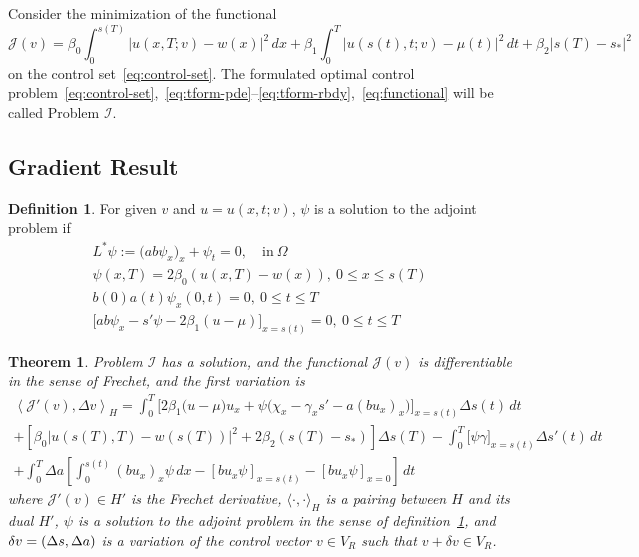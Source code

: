 \documentclass[letterpaper, 10pt, draft]{amsart}
\newtheorem{theorem}{Theorem}
\theoremstyle{definition}
\newtheorem{definition}{Definition}
\theoremstyle{remark}
\newcommand{\lnorm}[1]{\left\vert #1\right\vert}%
\begin{document}
Consider the minimization of the functional
\def\J{\mathcal{J}}
\begin{equation}
  \J(v)
  = \beta_0 \int_0^{s(T)} \lnorm{u(x, T; v) - w(x)}^2\,dx
  + \beta_1 \int_0^T \lnorm{u(s(t), t; v) - \mu(t)}^2\,dt
  + \beta_2 \lnorm{s(T) - s_*}^2\label{eq:functional}
\end{equation}
on the control set~\eqref{eq:control-set}.
\def\I{\mathcal{I}}
The formulated optimal control problem~\eqref{eq:control-set},~\eqref{eq:tform-pde}--\eqref{eq:tform-rbdy},~\eqref{eq:functional} will be called Problem $\I$.

\subsection{Gradient Result}\label{sec:frechet-gradient}

\begin{definition}\label{defn:adjoint}
  For given $v$ and $u = u(x, t; v)$, $\psi$ is a solution to the adjoint problem if
  \begin{gather}
    L^{*} \psi := \big(a b \psi_x\big)_x + \psi_t = 0,\quad\text{in}~\Omega \label{eq:adj-pde}
    \\
    \psi(x, T) = 2\beta_0(u(x, T) - w(x)),~0 \leq x \leq s(T) \label{eq:adj-finalmoment}
    \\
    b(0)a(t)\psi_x(0, t) =0,~0 \leq t \leq T \label{eq:adj-robin-fixed}
    \\
    \Big[a b \psi_x - s'\psi - 2\beta_1(u - \mu)\Big]_{x=s(t)}=0, ~0 \leq t \leq T \label{eq:adj-robin-free}
  \end{gather}
\end{definition}


\begin{theorem}\label{thm:gradient-result}
  Problem $\I$ has a solution, and the functional $\J(v)$ is differentiable in the sense of Frechet, and the first variation is
  \begin{gather}
    \left\langle \J'(v),\Delta v \right\rangle_H
    = \int_0^T \Big[2\beta_1\big(u - \mu\big)u_x + \psi \big(\chi_x - \gamma_x s'  - a (b u_x)_x \big)\Big]_{x=s(t)} {\Delta s}(t)\,dt \nonumber
    \\
    +
    \left[\beta_0\lnorm{u(s(T),T) - w(s(T))}^2 + 2 \beta_2 (s(T) - s_*)\right] {\Delta s}(T) 
    - \int_0^T \big[\psi \gamma\big]_{x=s(t)} {\Delta s}'(t) \,dt \nonumber
    \\
    +\int_0^T {\Delta a} \left[ \int_0^{s(t)} {(b u_x)}_x \psi \,dx - [b u_x\psi]_{x=s(t)} - [b u_x \psi]_{x=0}\right] \,dt\label{eq:gradient-full}
  \end{gather}
  where $\J'(v) \in H'$ is the Frechet derivative, $\langle \cdot,\cdot \rangle_H$ is a pairing between $H$ and its dual $H'$, $\psi$ is a solution to the adjoint problem in the sense of definition~\ref{defn:adjoint}, and $\delta v = ({\Delta s}, {\Delta a}{})$ is a variation of the control vector $v \in V_R$ such that $v + \delta v \in V_R$.
\end{theorem}
\end{document}

